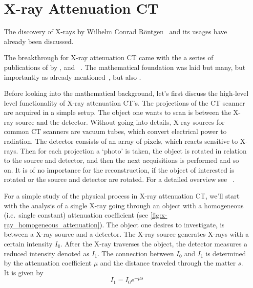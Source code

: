 \section{X-ray Attenuation CT}\label{sec:xray_attenuation_ct}

The discovery of X-rays by Wilhelm Conrad Röntgen~\cite{rontgen_uber_1895} and its usages have
already been discussed.

The breakthrough for X-ray attenuation CT came with the a series of publications of by
\citeauthor{hounsfield_computerized_1973}\cite{hounsfield_computerized_1973},
\citeauthor{ambrose_computerized_1973}\cite{ambrose_computerized_1973} and
~\citeauthor{perry_computerized_1973}\cite{perry_computerized_1973}. The mathematical foundation was
laid but many, but importantly as already mentioned~\citeauthor{radon_uber_1917}, but also
\citeauthor{cormack_representation_1963}\cite{cormack_representation_1963}.

Before looking into the mathematical background, let's first discuss the high-level level
functionality of X-ray attenuation CT's. The projections of the CT scanner are acquired in a
simple setup. The object one wants to scan is between the X-ray source and the detector. Without
going into details, X-ray sources for common CT scanners are vacuum tubes, which convert electrical
power to radiation. The detector consists of an array of pixels, which reacts sensitive to X-rays.
Then for each projection a `photo' is taken, the object is rotated in relation to the source and
detector, and then the next acquisitions is performed and so on. It is of no importance for the
reconstruction, if the object of interested is rotated or the source and detector are rotated. For
a detailed overview see \citeauthor{buzug_computed_2008}~\cite[Chapter~2]{buzug_computed_2008}.


For a simple study of the physical process in X-ray attenuation CT, we'll start with the analysis of
a single X-ray going through an object with a homogeneous (i.e.\ single constant) attenuation
coefficient (see \autoref{fig:x-ray_homogeneous_attenuation}). The object one desires to investigate,
is between a X-ray source and a detector. The X-ray source generates X-rays with a certain intensity
\(I_0\). After the X-ray traverses the object, the detector measures a reduced intensity denoted as
\(I_1\). The connection between \(I_0\) and \(I_1\) is determined by the attenuation coefficient
\(\mu\) and the distance traveled through the matter \(s\). It is given by
\[ I_1 = I_0 e^{-\mu s} \]

